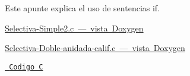\label{md_manuals_Apunte_IF_apunte_if}%
%
 Este apunte explica el uso de sentencias if.


\begin{DoxyItemize}
\item \mbox{\hyperlink{Selectiva-Simple2_8c_sel_simple}{Selectiva-\/\+Simple2.c — vista Doxygen}}
\item \mbox{\hyperlink{Selectiva-Doble-anidada-calif_8c_sel_doble}{Selectiva-\/\+Doble-\/anidada-\/calif.c — vista Doxygen}}
\end{DoxyItemize}

\href{file:///home/franky/Proyects/Trabajos-Universidad-Codigo-UDG/2semPE/c/src/Condicionales/Selectiva-Doble-anidada-calif.c}{\texttt{ Codigo C}} 